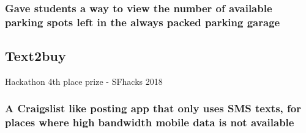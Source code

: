 \documentclass{article}
\begin{document}
		\subsubsection{Gave students a way to view the number of available parking spots left in the always packed parking garage}
		
	\subsection{Text2buy} Hackathon 4th place prize - SFhacks 2018
    	\vspace{-3mm}
		\subsubsection{A Craigslist  like posting app that only uses SMS texts, for places where high bandwidth mobile data is not available}
		
\end{document}
